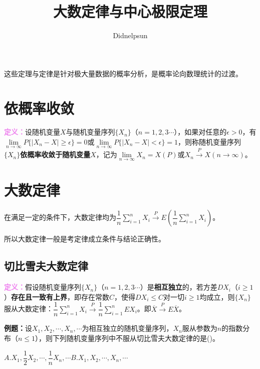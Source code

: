 \documentclass[UTF8, 12pt]{ctexart}
\author{Didnelpsun}
\title{大数定律与中心极限定理}
\date{}
\begin{document}
\maketitle
\pagestyle{empty}
\thispagestyle{empty}
\tableofcontents
\thispagestyle{empty}
\newpage
\pagestyle{plain}
\setcounter{page}{1}

这些定理与定律是针对极大量数据的概率分析，是概率论向数理统计的过渡。

\section{依概率收敛}

\textcolor{violet}{\textbf{定义：}}设随机变量$X$与随机变量序列$\{X_n\}$（$n=1,2,3\cdots$），如果对任意的$\epsilon>0$，有$\lim\limits_{n\to\infty}P\{\vert X_n-X\vert\geqslant\epsilon\}=0$或$\lim\limits_{n\to\infty}P\{\vert X_n-X\vert<\epsilon\}=1$，则称随机变量序列$\{X_n\}$\textbf{依概率收敛于随机变量$X$}，记为$\lim\limits_{n\to\infty}X_n=X(P)$或$X_n\overset{P}{\rightarrow}X(n\to\infty)$。

\section{大数定律}

在满足一定的条件下，大数定律均为$\dfrac{1}{n}\sum\limits_{i=1}^nX_i\overset{P}{\rightarrow}E\left(\dfrac{1}{n}\sum\limits_{i=1}^nX_i\right)$。

所以大数定律一般是考定律成立条件与结论正确性。

\subsection{切比雪夫大数定律}

\textcolor{violet}{\textbf{定义：}}假设随机变量序列$\{X_n\}$（$n=1,2,3\cdots$）是\textbf{相互独立}的，若方差$DX_i$（$i\geqslant1$）\textbf{存在且一致有上界}，即存在常数$C$，使得$DX_i\leqslant C$对一切$i\geqslant1$均成立，则$\{X_n\}$服从大数定律：$\dfrac{1}{n}\sum\limits_{i=1}^nX_i\overset{P}{\longrightarrow}\dfrac{1}{n}\sum\limits_{i=1}^nEX_i$。即$\overline{X}\overset{P}{\rightarrow}E\overline{X}$。

\textbf{例题：}设$X_1,X_2,\cdots,X_n,\cdots$为相互独立的随机变量序列，$X_n$服从参数为$n$的指数分布（$n\leqslant1$），则下列随机变量序列中不服从切比雪夫大数定律的是()。

$A.X_1,\dfrac{1}{2}X_2,\cdots,\dfrac{1}{n}X_n,\cdots$\qquad$B.X_1,X_2,\cdots,X_n,\cdots$
\end{document}
